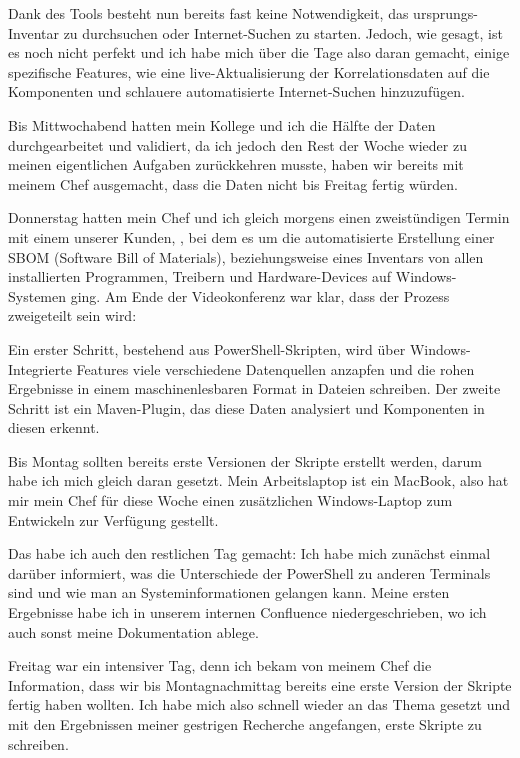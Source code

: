 Dank des Tools besteht nun bereits fast keine Notwendigkeit, das ursprungs-Inventar zu durchsuchen oder Internet-Suchen zu starten.
Jedoch, wie gesagt, ist es noch nicht perfekt und ich habe mich über die Tage also daran gemacht, einige spezifische Features, wie eine live-Aktualisierung der Korrelationsdaten auf die Komponenten und schlauere automatisierte Internet-Suchen hinzuzufügen.

Bis Mittwochabend hatten mein Kollege und ich die Hälfte der Daten durchgearbeitet und validiert, da ich jedoch den Rest der Woche wieder zu meinen eigentlichen Aufgaben zurückkehren musste, haben wir bereits mit meinem Chef ausgemacht, dass die Daten nicht bis Freitag fertig würden.


Donnerstag hatten mein Chef und ich gleich morgens einen zweistündigen Termin mit einem unserer Kunden, {\aeclientZEZESE}, bei dem es um die automatisierte Erstellung einer SBOM (Software Bill of Materials),
beziehungsweise eines Inventars von allen installierten Programmen, Treibern und Hardware-Devices auf Windows-Systemen ging.
Am Ende der Videokonferenz war klar, dass der Prozess zweigeteilt sein wird:

Ein erster Schritt, bestehend aus PowerShell-Skripten, wird über Windows-Integrierte Features viele verschiedene Datenquellen anzapfen und die rohen Ergebnisse in einem maschinenlesbaren Format in Dateien schreiben.
Der zweite Schritt ist ein Maven-Plugin, das diese Daten analysiert und Komponenten in diesen erkennt.

Bis Montag sollten bereits erste Versionen der Skripte erstellt werden, darum habe ich mich gleich daran gesetzt.
Mein Arbeitslaptop ist ein MacBook, also hat mir mein Chef für diese Woche einen zusätzlichen Windows-Laptop zum Entwickeln zur Verfügung gestellt.

Das habe ich auch den restlichen Tag gemacht:
Ich habe mich zunächst einmal darüber informiert, was die Unterschiede der PowerShell zu anderen Terminals sind und wie man an Systeminformationen gelangen kann.
Meine ersten Ergebnisse habe ich in unserem internen Confluence niedergeschrieben, wo ich auch sonst meine Dokumentation ablege.


Freitag war ein intensiver Tag, denn ich bekam von meinem Chef die Information, dass wir bis Montagnachmittag bereits eine erste Version der Skripte fertig haben wollten.
Ich habe mich also schnell wieder an das Thema gesetzt und mit den Ergebnissen meiner gestrigen Recherche angefangen, erste Skripte zu schreiben.

